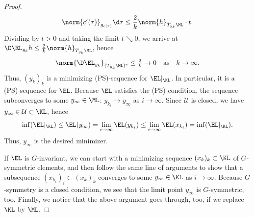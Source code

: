 \begin{proof}
\begin{equation}
	\norm{c'(\tau)}_{g_{c(\tau)}}\d \tau\le \frac2{k}\norm{h}_{T_{y_k}\ML}\cdot t
	.
\end{equation}
Dividing by $t>0$ and taking the limit $t\searrow 0$,
we arrive at
$\D \EL_{y_k} h \le \frac{2}{k} \norm{h}_{T_{y_k}\ML}$, hence
\[ 
	\norm{\D\EL_{y_k}}_{(T_{y_k}\ML)^*} \le \tfrac{2}{k}\to 0
	\quad  \text{as} \quad  k \to\infty
	.
\] 
Thus, $(y_k)_k$ is a minimizing (PS)-sequence for $\EL|_{\KL}$.
In particular, it is a (PS)-sequence for $\EL$.
Because $\EL$ satisfies the (PS)-condition, the sequence subconverges to some $y_\infty \in \ML$: $y_{k_i}\to y_\infty$ as $i\to\infty$.
Since $\mathcal{U}$ is closed, we have $y_\infty \in \mathcal{U} \subset \KL$, hence
\[
	\inf(\EL|_{\KL})
	\leq 
	\EL(y_\infty)
	=
	\lim_{i\to\infty} \EL(y_{k_i})
	\le
	\lim_{i\to\infty} \EL(x_{k_i})
	=
	\inf(\EL|_{\KL})
	. 
\]
Thus, $y_\infty$ is the desired minimizer.

If $\EL$ is $G$-invariant,
we can start with a minimizing sequence $(x_k)_k\subset\KL$ of $G$-symmetric
elements, and then follow the same line of arguments to show
that a subsequence $(x_{k_i})_i\subset (x_k)_k$ 
converges to some $y_\infty\in \KL$ as $i\to\infty$. Because $G$-symmetry is a closed condition, we see that the limit point $y_\infty$ is $G$-symmetric, too. Finally, we notice that the above argument goes through, too, if we replace $\KL$ by $\ML$.
\end{proof}